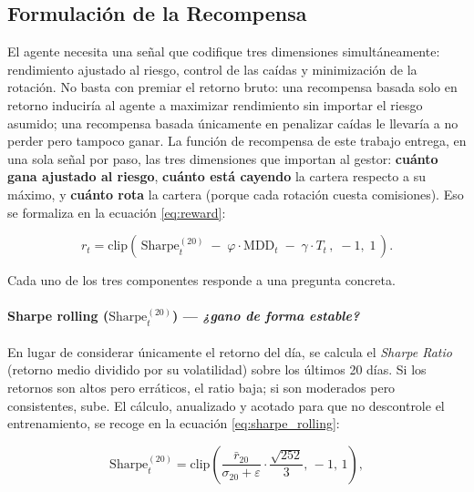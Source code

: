 \documentclass[IB,a4paper]{TFUOC}
\begin{document}
\subsection{Formulación de la Recompensa}

El agente necesita una señal que codifique tres dimensiones simultáneamente: rendimiento ajustado al riesgo, control de las caídas y minimización de la rotación. No basta con premiar el retorno bruto: una recompensa basada solo en retorno induciría al agente a maximizar rendimiento sin importar el riesgo asumido; una recompensa basada únicamente en penalizar caídas le llevaría a no perder pero tampoco ganar. La función de recompensa de este trabajo entrega, en una sola señal por paso, las tres dimensiones que importan al gestor: \textbf{cuánto gana ajustado al riesgo}, \textbf{cuánto está cayendo} la cartera respecto a su máximo, y \textbf{cuánto rota} la cartera (porque cada rotación cuesta comisiones). Eso se formaliza en la ecuación \eqref{eq:reward}:

\begin{equation}
r_t = \mathrm{clip}\!\left(\,\mathrm{Sharpe}^{(20)}_t \;-\; \varphi \cdot \mathrm{MDD}_t \;-\; \gamma \cdot T_t\,,\; -1,\; 1\,\right).
\label{eq:reward}
\end{equation}

Cada uno de los tres componentes responde a una pregunta concreta.

\paragraph{Sharpe rolling ($\mathrm{Sharpe}^{(20)}_t$) — \textit{¿gano de forma estable?}} En lugar de considerar únicamente el retorno del día, se calcula el \textit{Sharpe Ratio} (retorno medio dividido por su volatilidad) sobre los últimos 20 días. Si los retornos son altos pero erráticos, el ratio baja; si son moderados pero consistentes, sube. El cálculo, anualizado y acotado para que no descontrole el entrenamiento, se recoge en la ecuación \eqref{eq:sharpe_rolling}:

\begin{equation}
\mathrm{Sharpe}^{(20)}_t = \mathrm{clip}\!\left(
\frac{\bar{r}_{20}}{\sigma_{20} + \varepsilon} \cdot \frac{\sqrt{252}}{3},\,
-1,\, 1
\right),
\label{eq:sharpe_rolling}
\end{equation}
\end{document}
